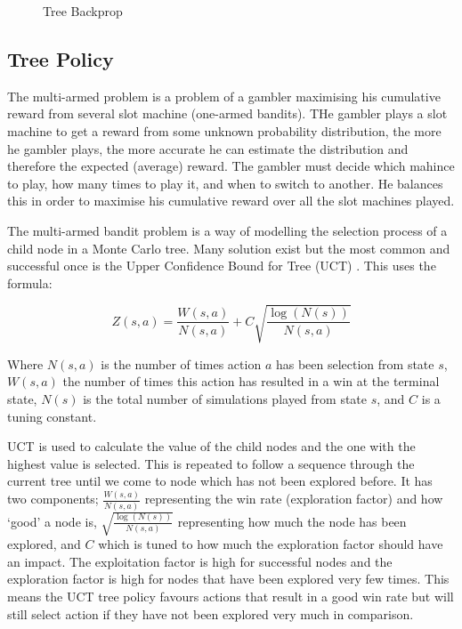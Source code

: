 \documentclass{bhamthesis}
\theoremstyle{definition}
\begin{document}
\begin{figure}
	
	\caption{Tree Backprop}\label{f:treeBackprop}
\end{figure}

\subsection{Tree Policy}\label{s:tPolicy}
The multi-armed problem is a problem of a gambler maximising his cumulative reward from several slot machine (one-armed bandits). THe gambler plays a slot machine to get a reward from some unknown probability distribution, the more he gambler plays, the more accurate he can estimate the distribution and therefore the expected (average) reward. The gambler must decide which mahince to play, how many times to play it, and when to switch to another. He balances this in order to maximise his cumulative reward over all the slot machines played. 

The multi-armed bandit problem is a way of modelling the selection process of a child node in a Monte Carlo tree. Many solution exist but the most common and successful once is the Upper Confidence Bound for Tree (UCT) \cite{Browne2012}. This uses the formula:

\begin{equation}\label{e:UCT}
Z(s,a) = \frac{W(s,a)}{N(s,a)} + C\sqrt{\frac{\log(N(s))}{N(s,a)}}
\end{equation} 


Where $N(s,a)$ is the number of times action $a$ has been selection from state $s$, $W(s,a)$ the number of times this action has resulted in a win at the terminal state, $N(s)$ is the total number of simulations played from state $s$, and $C$ is a tuning constant.

UCT is used to calculate the value of the child nodes and the one with the highest value is selected. This is repeated to follow a sequence through the current tree until we come to node which has not been explored before. It has two components; $\frac{W(s,a)}{N(s,a)}$ representing the win rate (exploration factor) and how `good' a node is, $\sqrt{\frac{\log(N(s))}{N(s,a)}}$ representing how much the node has been explored, and $C$ which is tuned to how much the exploration factor should have an impact. The exploitation factor is high for successful nodes and the exploration factor is high for nodes that have been explored very few times. This means the UCT tree policy favours actions that result in a good win rate but will still select action if they have not been explored very much in comparison.
\end{document}
